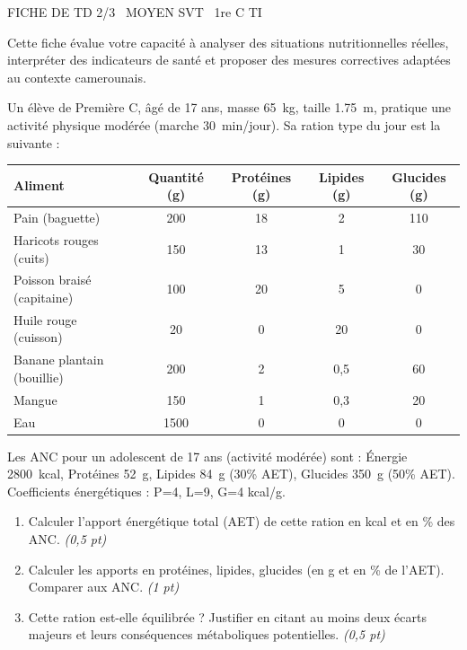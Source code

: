 \documentclass[11pt]{article}
\begin{document}
\begin{tcolorbox}[enhanced,colback=popink,colframe=popink,arc=10pt,boxrule=0pt,left=12pt,right=12pt,top=9pt,bottom=9pt]
{\color{white}\popxbold\small FICHE DE TD 2/3 \textbullet\ MOYEN \hfill SVT \textbullet\ 1re C TI\par}
\end{tcolorbox}
\vspace{4pt}
Cette fiche évalue votre capacité à analyser des situations nutritionnelles réelles, interpréter des indicateurs de santé et proposer des mesures correctives adaptées au contexte camerounais.

\begin{exercice}
Un élève de Première C, âgé de 17 ans, masse \SI{65}{kg}, taille \SI{1,75}{m}, pratique une activité physique modérée (marche \SI{30}{min}/jour). Sa ration type du jour est la suivante :
\begin{center}
\begin{tabularx}{\linewidth}{>{\raggedright\arraybackslash}X c c c c}
\hline
\textbf{Aliment} & \textbf{Quantité (g)} & \textbf{Protéines (g)} & \textbf{Lipides (g)} & \textbf{Glucides (g)} \\
\hline
Pain (baguette) & 200 & 18 & 2 & 110 \\
Haricots rouges (cuits) & 150 & 13 & 1 & 30 \\
Poisson braisé (capitaine) & 100 & 20 & 5 & 0 \\
Huile rouge (cuisson) & 20 & 0 & 20 & 0 \\
Banane plantain (bouillie) & 200 & 2 & 0,5 & 60 \\
Mangue & 150 & 1 & 0,3 & 20 \\
Eau & 1500 & 0 & 0 & 0 \\
\hline
\end{tabularx}
\end{center}
Les ANC pour un adolescent de 17 ans (activité modérée) sont : Énergie \SI{2800}{kcal}, Protéines \SI{52}{g}, Lipides \SI{84}{g} (30\% AET), Glucides \SI{350}{g} (50\% AET). Coefficients énergétiques : P=4, L=9, G=4 kcal/g.
\begin{enumerate}
    \item Calculer l'apport énergétique total (AET) de cette ration en kcal et en \% des ANC. \textit{(0,5 pt)}
    \item Calculer les apports en protéines, lipides, glucides (en g et en \% de l'AET). Comparer aux ANC. \textit{(1 pt)}
    \item Cette ration est-elle équilibrée ? Justifier en citant au moins deux écarts majeurs et leurs conséquences métaboliques potentielles. \textit{(0,5 pt)}
\end{enumerate}
\end{exercice}
\end{document}

